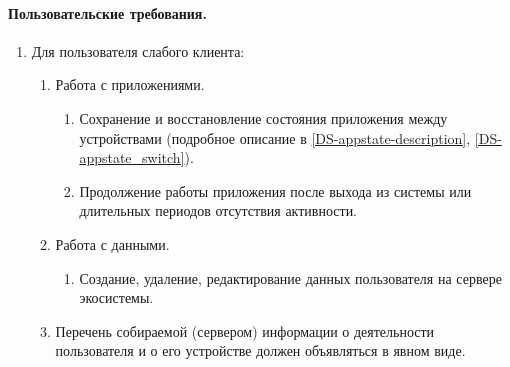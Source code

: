 \paragraph{Пользовательские требования.}
\begin{enumerate}[label={\bfseries ПТ-\arabic*.}]
   \item Для пользователя слабого клиента:
         \begin{enumerate}[label*={\bfseries\arabic*.}]
            \item Работа с приложениями.
                  \begin{enumerate}[nosep,label*={\bfseries\arabic*.}]
                     \item Сохранение и восстановление состояния приложения между устройствами (подробное описание в \ref{DS-appstate-description}, \ref{DS-appstate_switch}).
                     \item Продолжение работы приложения после выхода из системы или длительных периодов отсутствия активности.
                  \end{enumerate}
            \item Работа с данными.
                  \begin{enumerate}[nosep,label*={\bfseries\arabic*.}]
                     \item Создание, удаление, редактирование данных пользователя на сервере экосистемы.
                  \end{enumerate}
            \item Перечень собираемой (сервером) информации о деятельности пользователя и о его устройстве должен объявляться в явном виде.
         \end{enumerate}


\end{enumerate}
